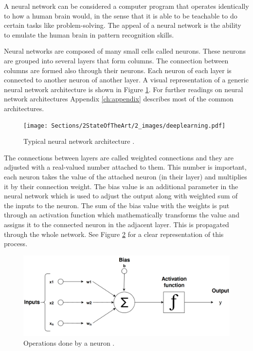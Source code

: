     \par A neural network can be considered a computer program that operates identically to how a human brain would, in the sense that it is able to be teachable to do certain tasks like problem-solving. The appeal of a neural network is the ability to emulate the human brain in pattern recognition skills. 


    \par Neural networks are composed of many small cells called neurons. These neurons are grouped into several layers that form columns. The connection between columns are formed also through their neurons. Each neuron of each layer is connected to another neuron of another layer. A visual representation of a generic neural network architecture is shown in Figure \ref{fig:neural}. For further readings on neural network architectures Appendix \ref{ch:appendix} describes most of the common architectures.


    \begin{figure}[htb]
        \centering
        \texttt{[image: Sections/2StateOfTheArt/2\_images/deeplearning.pdf]}
        \caption[Typical neural network architecture.]{Typical neural network architecture \cite{mathworks_NN}.}
        \label{fig:neural}
    \end{figure}
        
    
    \par The connections between layers are called weighted connections and they are adjusted with a real-valued number attached to them. This number is important, each neuron takes the value of the attached neuron (in their layer) and multiplies it by their connection weight. The bias value is an additional parameter in the neural network which is used to adjust the output along with weighted sum of the inputs to the neuron. The sum of the bias value with the weights  is put through an activation function which mathematically transforms the value and assigns it to the connected neuron in the adjacent layer. This is propagated through the whole network.  See Figure \ref{fig:neuron} for a clear representation of this process.
    

    
    \begin{figure}[htb]
        \centering
        \includegraphics[scale = 0.15]{Sections/2StateOfTheArt/2_images/neuron.png}
        \caption[Operations done by a neuron.]{Operations done by a neuron \cite{neuron}.}
        \label{fig:neuron}
    \end{figure}
    
